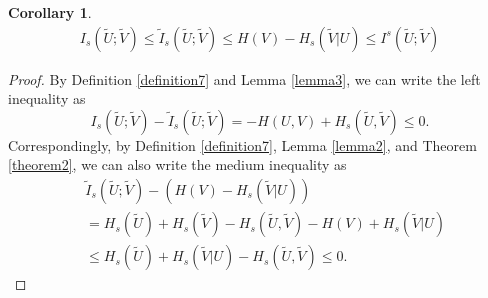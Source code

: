 \documentclass[12pt, draftclsnofoot,onecolumn]{IEEEtran}
\newtheorem{corollary}{\bf{Corollary}}
\begin{document}
\begin{corollary}
\begin{equation}
\begin{aligned}
I_s(\tilde{U};\tilde{V}) \leq \tilde{I}_s (\tilde{U};\tilde{V}) \leq H(V)-H_s(\tilde{V}\left|U\right.) \leq I^s(\tilde{U};\tilde{V})
\end{aligned}
\end{equation}
\end{corollary}
\begin{proof}
By Definition \ref{definition7} and Lemma \ref{lemma3}, we can write the left inequality as
\begin{equation}
I_s(\tilde{U};\tilde{V})-\tilde{I}_s(\tilde{U};\tilde{V})=-H(U,V)+H_s(\tilde{U},\tilde{V})\leq 0.
\end{equation}
Correspondingly, by Definition \ref{definition7}, Lemma \ref{lemma2}, and Theorem \ref{theorem2}, we can also write the medium inequality as
\begin{equation}
\begin{aligned}
&\tilde{I}_s (\tilde{U};\tilde{V})-(H(V)-H_s(\tilde{V}\left|U\right.))\\
&=H_s(\tilde{U})+H_s(\tilde{V})-H_s(\tilde{U},\tilde{V})-H(V)+H_s (\tilde{V}\left|U\right. )\\
&\leq H_s(\tilde{U})+H_s (\tilde{V}\left|U\right. )-H_s(\tilde{U},\tilde{V})\leq 0.
\end{aligned}
\end{equation}
\end{proof}
\end{document}
